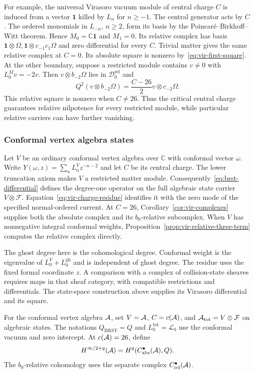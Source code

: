 For example, the universal Virasoro vacuum module of central charge $C$ is induced from a vector $\mathbf1$ killed by $L_n$ for $n\geq-1$.
The central generator acts by $C$.
The ordered monomials in $L_{-n}$, $n\geq2$, form its basis by the Poincar\'e--Birkhoff--Witt theorem.
Hence $M_0=\mathbb C\mathbf1$ and $M_1=0$.
Its relative complex has basis $\mathbf1\otimes\Omega,\mathbf1\otimes c_{-1}c_1\Omega$ and zero differential for every $C$.
Trivial matter gives the same relative complex at $C=0$.
Its absolute square is nonzero by~\eqref{eq:vir-first-square}.
At the other boundary, suppose a restricted module contains $v\neq0$ with $L_0^Mv=-2v$.
Then $v\otimes b_{-2}\Omega$ lies in $\mathcal D_0^{\mathrm{rel}}$ and
\[
 Q^2(v\otimes b_{-2}\Omega)=\frac{C-26}{2}v\otimes c_{-2}\Omega.
\]
This relative square is nonzero when $C\neq26$.
Thus the critical central charge guarantees relative nilpotence for every restricted module, while particular relative carriers can have further vanishing.

\subsubsection{Conformal vertex algebra states}

Let $V$ be an ordinary conformal vertex algebra over $\mathbb C$ with conformal vector $\omega$.
Write
$Y(\omega,z)=\sum_nL_n^Vz^{-n-2}$ and let $C$ be its central charge.
The lower truncation axiom makes $V$ a restricted matter module.
Consequently~\eqref{eq:brst-differential} defines the degree-one operator on the full algebraic state carrier $V\otimes\mathcal F$.
Equation~\eqref{eq:vir-charge-residue} identifies it with the zero mode of the specified normal-ordered current.
At $C=26$, Corollary~\ref{cor:vir-complexes} supplies both the absolute complex and its $b_0$-relative subcomplex.
When $V$ has nonnegative integral conformal weights, Proposition~\ref{prop:vir-relative-three-term} computes the relative complex directly.

The ghost degree here is the cohomological degree.
Conformal weight is the eigenvalue of $L_0^V+L_0^{\mathrm{gh}}$ and is independent of ghost degree.
The residue uses the fixed formal coordinate $z$.
A comparison with a complex of collision-state sheaves requires maps in that sheaf category, with compatible restrictions and differentials.
The state-space construction above supplies its Virasoro differential and its square.

For the conformal vertex algebra $\mathcal{A}$, set $V=\mathcal{A}$, $C=c(\mathcal{A})$, and $\mathcal{A}_{\mathrm{tot}}=V\otimes\mathcal F$ on algebraic states.
The notations $Q_{\mathrm{BRST}}=Q$ and $L_0^{\mathrm{tot}}=\mathcal L_0$ use the conformal vacuum and zero intercept.
At $c(\mathcal{A})=26$, define
\[
 H^{\infty/2+q}(\mathcal{A})=H^q(C_{\mathrm{abs}}^\bullet(\mathcal{A}),Q).
\]
The $b_0$-relative cohomology uses the separate complex $C_{\mathrm{rel}}^\bullet(\mathcal{A})$.

